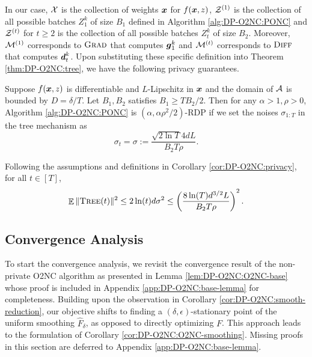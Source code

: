 In our case, ${\cal X}$ is the collection of weights ${\boldsymbol{x}}$ for $f({\boldsymbol{x}},z)$, ${\cal Z}^{(1)}$ is the collection of all possible batches $Z_1^k$ of size $B_1$ defined in Algorithm \ref{alg:DP-O2NC:PONC} and ${\cal Z}^{(t)}$ for $t\ge 2$ is the collection of all possible batches $Z_t^k$ of size $B_2$. Moreover, ${\cal M}^{(1)}$ corresponds to ${\normalfont\textsc{Grad}}$ that computes ${\boldsymbol{g}}_1^k$ and ${\cal M}^{(t)}$ corresponds to ${\normalfont\textsc{Diff}}$ that computes ${\boldsymbol{d}}_t^k$. Upon substituting these specific definition into Theorem \ref{thm:DP-O2NC:tree}, we have the following privacy guarantees.

\begin{lemma}
\label{cor:DP-O2NC:privacy}
Suppose $f({\boldsymbol{x}},z)$ is differentiable and $L$-Lipschitz in ${\boldsymbol{x}}$ and the domain of ${\cal A}$ is bounded by $D={\delta}/{T}$. Let $B_1,B_2$ satisfies $B_1\ge TB_2/2$. Then for any $\alpha>1, \rho>0$, Algorithm \ref{alg:DP-O2NC:PONC} is $(\alpha,\alpha\rho^2/2)$-RDP if we set the noises $\sigma_{1:T}$ in the tree mechanism as
\begin{equation*}
    \sigma_t = \sigma := \frac{\sqrt{2\ln T}4dL}{B_2T\rho}.
\end{equation*}
\end{lemma}

\begin{corollary}
\label{cor:DP-O2NC:tree-noise}
Following the assumptions and definitions in Corollary \ref{cor:DP-O2NC:privacy}, for all $t\in [T]$,
\begin{equation*}
    \mathop{\mathbb{E}}\|\textsc{Tree}(t)\|^2 \le 2\ln(t) d\sigma^2 \le \left( \frac{8\ln(T) d^{3/2}L}{B_2T\rho} \right)^2.
\end{equation*}
\end{corollary}


\subsection{Convergence Analysis}
\label{sec:DP-O2NC_convergence}

To start the convergence analysis, we revisit the convergence result of the non-private O2NC algorithm as presented in Lemma \ref{lem:DP-O2NC:O2NC-base} whose proof is included in Appendix \ref{app:DP-O2NC:base-lemma} for completeness. Building upon the observation in Corollary \ref{cor:DP-O2NC:smooth-reduction}, our objective shifts to finding a $(\delta,\epsilon)$-stationary point of the uniform smoothing $\hat F_\delta$, as opposed to directly optimizing $F$. This approach leads to the formulation of Corollary \ref{cor:DP-O2NC:O2NC-smoothing}. Missing proofs in this section are deferred to Appendix \ref{app:DP-O2NC:base-lemma}.

